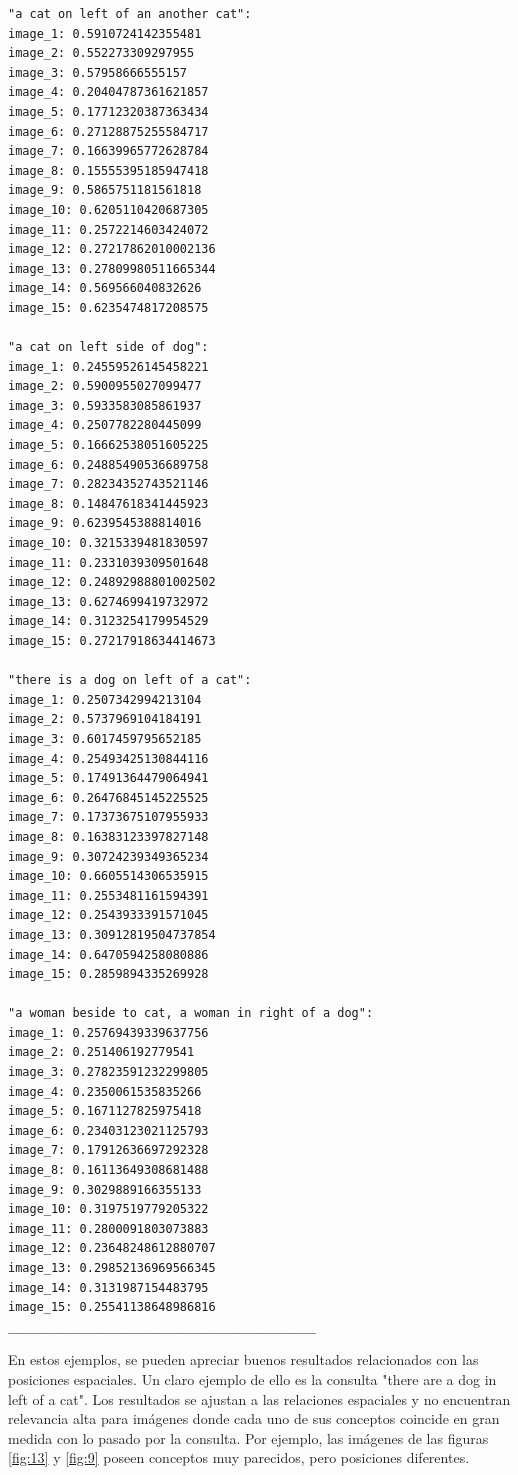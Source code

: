 \begin{verbatim}
"a cat on left of an another cat":
image_1: 0.5910724142355481
image_2: 0.552273309297955
image_3: 0.57958666555157
image_4: 0.20404787361621857
image_5: 0.17712320387363434
image_6: 0.27128875255584717
image_7: 0.16639965772628784
image_8: 0.15555395185947418
image_9: 0.5865751181561818
image_10: 0.6205110420687305
image_11: 0.2572214603424072
image_12: 0.27217862010002136
image_13: 0.27809980511665344
image_14: 0.569566040832626
image_15: 0.6235474817208575

"a cat on left side of dog":
image_1: 0.24559526145458221
image_2: 0.5900955027099477
image_3: 0.5933583085861937
image_4: 0.2507782280445099
image_5: 0.16662538051605225
image_6: 0.24885490536689758
image_7: 0.28234352743521146
image_8: 0.14847618341445923
image_9: 0.6239545388814016
image_10: 0.3215339481830597
image_11: 0.2331039309501648
image_12: 0.24892988801002502
image_13: 0.6274699419732972
image_14: 0.3123254179954529
image_15: 0.27217918634414673

"there is a dog on left of a cat":
image_1: 0.2507342994213104
image_2: 0.5737969104184191
image_3: 0.6017459795652185
image_4: 0.25493425130844116
image_5: 0.17491364479064941
image_6: 0.26476845145225525
image_7: 0.17373675107955933
image_8: 0.16383123397827148
image_9: 0.30724239349365234
image_10: 0.6605514306535915
image_11: 0.2553481161594391
image_12: 0.2543933391571045
image_13: 0.30912819504737854
image_14: 0.6470594258080886
image_15: 0.2859894335269928

"a woman beside to cat, a woman in right of a dog":
image_1: 0.25769439339637756
image_2: 0.251406192779541
image_3: 0.27823591232299805
image_4: 0.2350061535835266
image_5: 0.1671127825975418
image_6: 0.23403123021125793
image_7: 0.17912636697292328
image_8: 0.16113649308681488
image_9: 0.3029889166355133
image_10: 0.3197519779205322
image_11: 0.2800091803073883
image_12: 0.23648248612880707
image_13: 0.29852136969566345
image_14: 0.3131987154483795
image_15: 0.25541138648986816
___________________________________________

\end{verbatim}

En estos ejemplos, se pueden apreciar buenos resultados relacionados con las posiciones espaciales. Un claro ejemplo de ello es la consulta "there are a dog in left of a cat". Los resultados se ajustan a las relaciones espaciales y no encuentran relevancia alta para im\'agenes donde cada uno de sus conceptos coincide en gran medida con lo pasado por la consulta. Por ejemplo, las im\'agenes de las figuras \ref{fig:13} y \ref{fig:9} poseen conceptos muy parecidos, pero posiciones diferentes.

